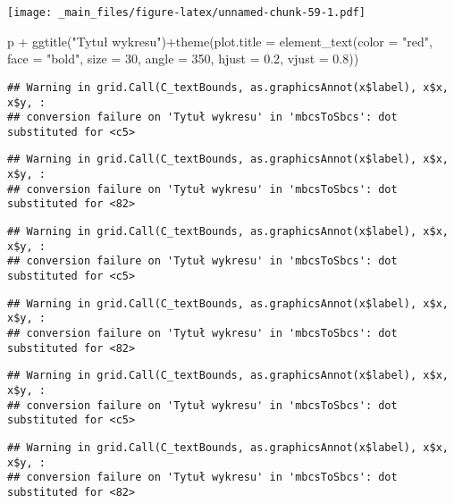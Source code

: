 \documentclass[
]{book}
\newenvironment{Shaded}{\begin{snugshade}}{\end{snugshade}}
\newcommand{\AttributeTok}[1]{\textcolor[rgb]{0.77,0.63,0.00}{#1}}
\newcommand{\DecValTok}[1]{\textcolor[rgb]{0.00,0.00,0.81}{#1}}
\newcommand{\FloatTok}[1]{\textcolor[rgb]{0.00,0.00,0.81}{#1}}
\newcommand{\FunctionTok}[1]{\textcolor[rgb]{0.00,0.00,0.00}{#1}}
\newcommand{\NormalTok}[1]{#1}
\newcommand{\SpecialCharTok}[1]{\textcolor[rgb]{0.00,0.00,0.00}{#1}}
\newcommand{\StringTok}[1]{\textcolor[rgb]{0.31,0.60,0.02}{#1}}
\begin{document}
\texttt{[image: \_main\_files/figure-latex/unnamed-chunk-59-1.pdf]}

\begin{Shaded}
\begin{Highlighting}[]
\NormalTok{p }\SpecialCharTok{+} \FunctionTok{ggtitle}\NormalTok{(}\StringTok{"Tytuł wykresu"}\NormalTok{)}\SpecialCharTok{+}\FunctionTok{theme}\NormalTok{(}\AttributeTok{plot.title =} \FunctionTok{element\_text}\NormalTok{(}\AttributeTok{color =} \StringTok{"red"}\NormalTok{, }
                                                           \AttributeTok{face =} \StringTok{"bold"}\NormalTok{, }\AttributeTok{size =} \DecValTok{30}\NormalTok{, }\AttributeTok{angle =} \DecValTok{350}\NormalTok{, }\AttributeTok{hjust =} \FloatTok{0.2}\NormalTok{, }\AttributeTok{vjust =} \FloatTok{0.8}\NormalTok{))}
\end{Highlighting}
\end{Shaded}

\begin{verbatim}
## Warning in grid.Call(C_textBounds, as.graphicsAnnot(x$label), x$x, x$y, :
## conversion failure on 'Tytuł wykresu' in 'mbcsToSbcs': dot substituted for <c5>
\end{verbatim}

\begin{verbatim}
## Warning in grid.Call(C_textBounds, as.graphicsAnnot(x$label), x$x, x$y, :
## conversion failure on 'Tytuł wykresu' in 'mbcsToSbcs': dot substituted for <82>
\end{verbatim}

\begin{verbatim}
## Warning in grid.Call(C_textBounds, as.graphicsAnnot(x$label), x$x, x$y, :
## conversion failure on 'Tytuł wykresu' in 'mbcsToSbcs': dot substituted for <c5>
\end{verbatim}

\begin{verbatim}
## Warning in grid.Call(C_textBounds, as.graphicsAnnot(x$label), x$x, x$y, :
## conversion failure on 'Tytuł wykresu' in 'mbcsToSbcs': dot substituted for <82>
\end{verbatim}

\begin{verbatim}
## Warning in grid.Call(C_textBounds, as.graphicsAnnot(x$label), x$x, x$y, :
## conversion failure on 'Tytuł wykresu' in 'mbcsToSbcs': dot substituted for <c5>
\end{verbatim}

\begin{verbatim}
## Warning in grid.Call(C_textBounds, as.graphicsAnnot(x$label), x$x, x$y, :
## conversion failure on 'Tytuł wykresu' in 'mbcsToSbcs': dot substituted for <82>
\end{verbatim}
\end{document}
